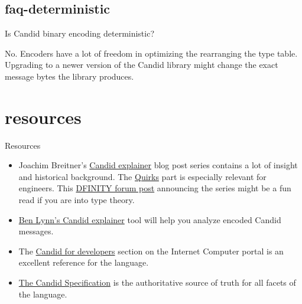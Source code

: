 \documentclass{article}
\begin{document}
\subsection{faq-deterministic}{Is Candid binary encoding deterministic?}

No.
Encoders have a lot of freedom in optimizing the rearranging the type table.
Upgrading to a newer version of the Candid library might change the exact message bytes the library produces.

\section{resources}{Resources}

\begin{itemize}
    \item
    Joachim Breitner's \href{https://www.joachim-breitner.de/blog/782-A_Candid_explainer__The_rough_idea}{Candid explainer} blog post series contains a lot of insight and historical background.
    The \href{https://www.joachim-breitner.de/blog/786-A_Candid_explainer__Quirks}{Quirks} part is especially relevant for engineers.
    This \href{https://forum.dfinity.org/t/candid-explainer-first-post-published/6787}{DFINITY forum post} announcing the series might be a fun read if you are into type theory.
    \item
    \href{https://fxa77-fiaaa-aaaae-aaana-cai.raw.ic0.app/explain}{Ben Lynn's Candid explainer} tool will help you analyze encoded Candid messages.
    \item
    The \href{https://internetcomputer.org/docs/current/developer-docs/build/candid/candid-intro/}{Candid for developers} section on the Internet Computer portal is an excellent reference for the language.
    \item
    \href{https://github.com/dfinity/candid/blob/master/spec/Candid.md}{The Candid Specification} is the authoritative source of truth for all facets of the language.
\end{itemize}
\end{document}
